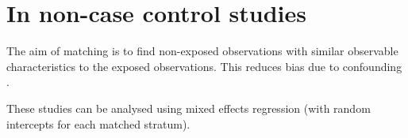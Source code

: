 \documentclass[]{book}
\theoremstyle{definition}
\theoremstyle{definition}
\theoremstyle{remark}
\begin{document}
\section{In non-case control studies}\label{in-non-case-control-studies}

The aim of matching is to find non-exposed observations with similar
observable characteristics to the exposed observations. This reduces
bias due to confounding \citep{rubin_matching_1973}.

These studies can be analysed using mixed effects regression (with
random intercepts for each matched stratum).


\end{document}
